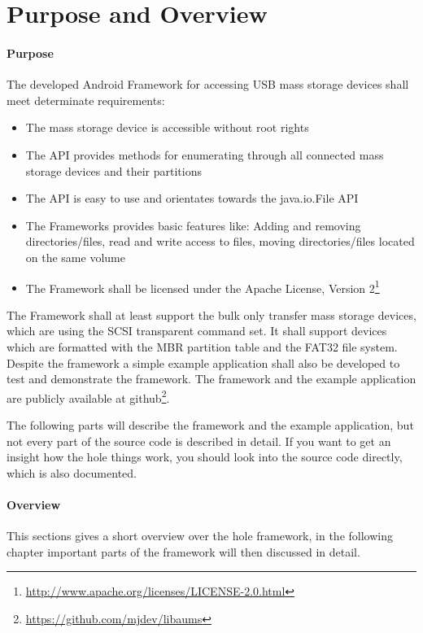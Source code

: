 \chapter{Purpose and Overview}

\subsubsection{Purpose}

The developed Android Framework for accessing USB mass storage devices shall meet determinate requirements:

\begin{itemize}
\item The mass storage device is accessible without root rights
\item The API provides methods for enumerating through all connected mass storage devices and their partitions
\item The API is easy to use and orientates towards the java.io.File API
\item The Frameworks provides basic features like: Adding and removing directories/files, read and write access to files, moving directories/files located on the same volume
\item The Framework shall be licensed under the Apache License, Version 2\footnote{\url{http://www.apache.org/licenses/LICENSE-2.0.html}}
\end{itemize}

The Framework shall at least support the bulk only transfer mass storage devices, which are using the SCSI transparent command set. It shall support devices which are formatted with the MBR partition table and the FAT32 file system. Despite the framework a simple example application shall also be developed to test and demonstrate the framework. The framework and the example application are publicly available at github\footnote{\url{https://github.com/mjdev/libaums}}.

The following parts will describe the framework and the example application, but not every part of the source code is described in detail. If you want to get an insight how the hole things work, you should look into the source code directly, which is also documented.

\subsubsection{Overview}
\label{implementation_overview}

This sections gives a short overview over the hole framework, in the following chapter important parts of the framework will then discussed in detail.

